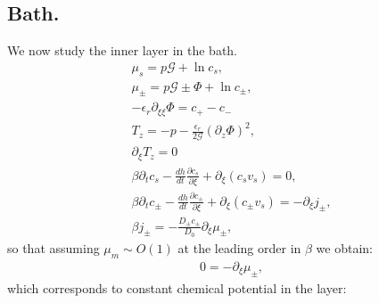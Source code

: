 \documentclass[12pt]{extarticle}
\begin{document}
\subsection{Bath.}
We now study the inner layer  in the bath.
\begin{gather}
\mu_s = p \mathcal{G} + \ln c_s, \\
\mu_\pm = p \mathcal{G} \pm \Phi + \ln c_\pm ,\\
-\epsilon_r\partial_{\xi\xi} \Phi = c_+-c_-\, \label{Poi2.1}\\
T_z= -p-\frac{\epsilon_r }{2\mathcal{G}} (\partial_z \Phi)^2,\\
\partial_\xi T_z=0\\
\beta \partial_t c_s -\frac{dh}{dt}\frac{\partial c_s}{\partial \xi}+\partial_\xi(c_s v_s)= 0,\\
\beta \partial_t c_\pm -\frac{dh}{dt}\frac{\partial c_\pm}{\partial \xi}+\partial_\xi(c_\pm v_s)= -\partial_\xi j_\pm,\\
\beta j_\pm= - \frac{D_\pm c_\pm}{D_0}\partial_\xi \mu_\pm,
\end{gather}
so that assuming $\mu_m\sim O(1)$ at the leading order in $\beta$ we obtain:
\begin{gather}
0= - \partial_\xi \mu_\pm ,
\end{gather}
which corresponds to constant chemical potential in the layer:
\end{document}
